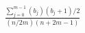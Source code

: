 \documentclass[preview]{standalone}
\begin{document}
\begin{align*}
{\frac {\sum _{j=0}^{m-1}(b_{j})(b_{j}+1)/2}{(n/2m)(n+2m-1)}}
\end{align*}
\end{document}
